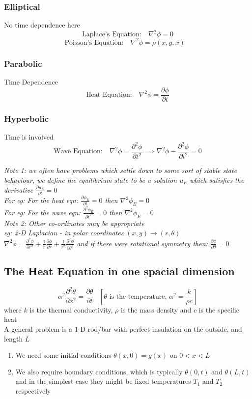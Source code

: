 \documentclass[11pt]{article}
\theoremstyle{definition}
\newcommand{\pd}{{\partial}}
\newcommand*{\pdo}[2]{\frac{\pd{#1}}{\pd{#2}}}%
\newcommand*{\pdt}[2]{\frac{\pd^2{#1}}{\pd{#2}^2}}
\newcommand*{\nbt}{\nabla^2}
\begin{document}
\subsubsection{Elliptical}
No time dependence here
$$\text{Laplace's Equation}:\;\;\; \nbt \phi = 0  $$
$$\text{Poisson's Equation}:\;\;\; \nbt \phi = \rho(x,y,x)  \;\;\; $$
\subsubsection{Parabolic}
Time Dependence
$$\text{Heat Equation}:\;\;\; \nbt \phi = \pdo{\phi}{t}$$
\subsubsection{Hyperbolic}
Time is involved
$$\text{Wave Equation}:\;\;\; \nbt \phi = \pdt{\phi}{t} \implies \nbt \phi - \pdt{\phi}{t} = 0$$

\textit{Note 1: we often have problems which settle down to some sort of stable state behaviour, we define the equilibrium state to be a solution $u_E$ which satisfies the derivative $\pdo{u_E}{t} = 0$\\
For eg: For the heat eqn:
$\pdo{\phi_E}{t} = 0$ then $\nbt \phi_E = 0$\\
For eg: For the wave eqn:\vspace{5mm}
$\pdt{\phi_E}{t} = 0$ then $\nbt \phi_E = 0$}\\

\textit{Note 2: Other co-ordinates may be appropriate\\
eg: 2-D Laplacian - in polar coordinates $(x,y) \rightarrow (r, \theta)$\\
$\nbt \phi = \pdt{\phi}{r} + \frac{1}{r} \pdo{\phi}{r} + \frac{1}{r^2} \pdt{\phi}{\theta}$ and if there were rotational symmetry then: $\pdo{\phi}{\theta} = 0$}
\newpage
\subsection{The Heat Equation in one spacial dimension}

$$ \alpha^2 \pdt{\theta}{x} = \pdo{\theta}{t} \;\;\; [\theta \text{ is the temperature, } \alpha^2 = \frac{k}{\rho c}]$$
where $k$ is the thermal conductivity, $\rho$ is the mass density and $c$ is the specific heat\\
A general problem is a 1-D rod/bar with perfect insulation on the outside, and length $L$
\begin{enumerate}[topsep=0pt]
    \item We need some initial conditions $\theta(x, 0) = g(x)$ on $0 < x < L$
    \item We also require boundary conditions, which is typically $\theta(0,t)$ and $\theta(L,t)$ and in the simplest case they might be fixed temperatures $T_1$ and $T_2$ respectively
\end{enumerate}
\end{document}
